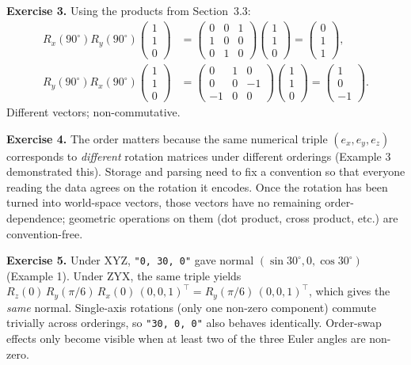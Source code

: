 \documentclass{article}
\begin{document}
\textbf{Exercise 3.} Using the products from Section~3.3:
\begin{align*}
R_x(90^\circ)R_y(90^\circ)\begin{pmatrix}1\\1\\0\end{pmatrix} &= \begin{pmatrix}0&0&1\\1&0&0\\0&1&0\end{pmatrix}\begin{pmatrix}1\\1\\0\end{pmatrix} = \begin{pmatrix}0\\1\\1\end{pmatrix},\\
R_y(90^\circ)R_x(90^\circ)\begin{pmatrix}1\\1\\0\end{pmatrix} &= \begin{pmatrix}0&1&0\\0&0&-1\\-1&0&0\end{pmatrix}\begin{pmatrix}1\\1\\0\end{pmatrix} = \begin{pmatrix}1\\0\\-1\end{pmatrix}.
\end{align*}
Different vectors; non-commutative.

\textbf{Exercise 4.} The order matters because the same numerical triple
$(e_x, e_y, e_z)$ corresponds to \emph{different} rotation matrices under
different orderings (Example 3 demonstrated this). Storage and parsing
need to fix a convention so that everyone reading the data agrees on the
rotation it encodes. Once the rotation has been turned into world-space
vectors, those vectors have no remaining order-dependence; geometric
operations on them (dot product, cross product, etc.) are convention-free.

\textbf{Exercise 5.} Under XYZ, \lstinline|"0, 30, 0"| gave normal
$(\sin 30^\circ, 0, \cos 30^\circ)$ (Example 1). Under ZYX, the same triple
yields $R_z(0)\,R_y(\pi/6)\,R_x(0)\,(0,0,1)^\top = R_y(\pi/6)\,(0,0,1)^\top$,
which gives the \emph{same} normal. Single-axis rotations (only one
non-zero component) commute trivially across orderings, so
\lstinline|"30, 0, 0"| also behaves identically. Order-swap effects only
become visible when at least two of the three Euler angles are non-zero.
\end{document}
